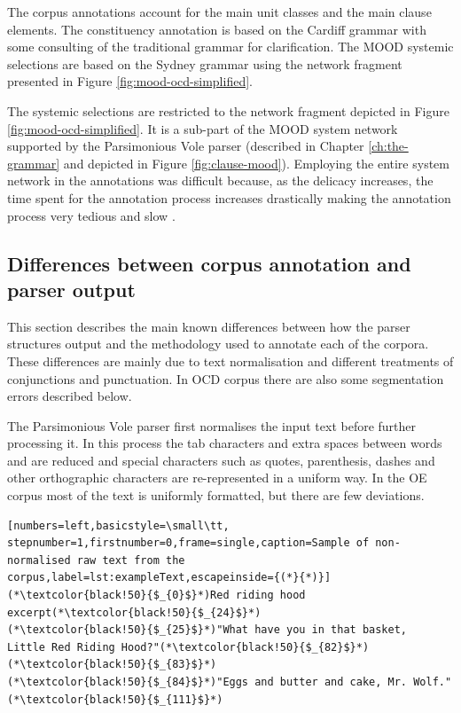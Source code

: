     The corpus annotations account for the main unit classes and the main clause elements. The constituency annotation is based on the Cardiff grammar \citep{Fawcett2008} with some consulting of the traditional grammar \citep{Quirk1985} for clarification. The MOOD systemic selections are based on the Sydney grammar \citep{Halliday2013} using the network fragment presented in Figure \ref{fig:mood-ocd-simplified}.
    
    The systemic selections are restricted to the network fragment depicted in Figure \ref{fig:mood-ocd-simplified}. It is a sub-part of the MOOD system network supported by the Parsimonious Vole parser (described in Chapter \ref{ch:the-grammar} and depicted in Figure \ref{fig:clause-mood}). Employing the entire system network in the annotations was difficult because, as the delicacy increases, the time spent for the annotation process increases drastically making the annotation process very tedious and slow \citep{mcenery2006corpus}.
    
\subsection{Differences between corpus annotation and parser output}
\label{sec:differences}

    This section describes the main known differences between how the parser structures output and the methodology used to annotate each of the corpora. These differences are mainly due to text normalisation and different treatments of conjunctions and punctuation. In OCD corpus there are also some segmentation errors described below.
    
    The Parsimonious Vole parser first normalises the input text before further processing it. In this process the tab characters and extra spaces between words and are reduced and special characters such as quotes, parenthesis, dashes and other orthographic characters are re-represented in a uniform way. In the OE corpus most of the text is uniformly formatted, but there are few deviations. 
    
\begin{minipage}{\linewidth}
\begin{lstlisting}[numbers=left,basicstyle=\small\tt, stepnumber=1,firstnumber=0,frame=single,caption=Sample of non-normalised raw text from the corpus,label=lst:exampleText,escapeinside={(*}{*)}]
(*\textcolor{black!50}{$_{0}$}*)Red riding hood excerpt(*\textcolor{black!50}{$_{24}$}*)
(*\textcolor{black!50}{$_{25}$}*)"What have you in that basket,   Little Red Riding Hood?"(*\textcolor{black!50}{$_{82}$}*)
(*\textcolor{black!50}{$_{83}$}*)
(*\textcolor{black!50}{$_{84}$}*)"Eggs and butter and cake, Mr. Wolf."(*\textcolor{black!50}{$_{111}$}*)
\end{lstlisting}
\end{minipage}

